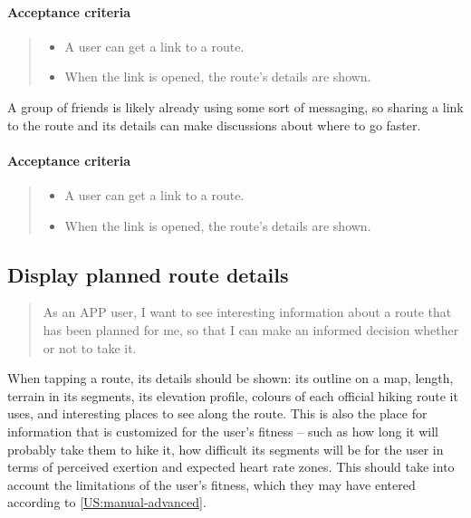 \paragraph*{Acceptance criteria}
\begin{quote}
    \begin{itemize}
        \item A user can get a link to a route.
        \item When the link is opened, the route's details are shown.
    \end{itemize}
\end{quote}

A group of friends is likely already using some sort of messaging, so sharing a link to the route and its details can make discussions about where to go faster.

\paragraph*{Acceptance criteria}
\begin{quote}
    \begin{itemize}
        \item A user can get a link to a route.
        \item When the link is opened, the route's details are shown.
    \end{itemize}
\end{quote}

\subsection{Display planned route details}\label{US:map-planned-details}
\begin{quote}
As an APP user, I want to see interesting information about a route that has been planned for me, so that I can make an informed decision whether or not to take it.
\end{quote}

When tapping a route, its details should be shown: its outline on a map, length, terrain in its segments, its elevation profile, colours of each official hiking route it uses, and interesting places to see along the route.
This is also the place for information that is customized for the user's fitness -- such as how long it will probably take them to hike it, how difficult its segments will be for the user in terms of perceived exertion and expected heart rate zones.
This should take into account the limitations of the user's fitness, which they may have entered according to \ref{US:manual-advanced}.

